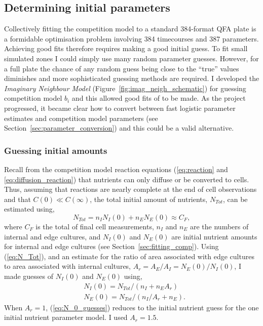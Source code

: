 \subsection{Determining initial parameters}
\label{sec:initial_guess}

Collectively fitting the competition model to a standard 384-format
QFA plate is a formidable optimisation problem involving 384
timecourses and 387 parameters. Achieving good fits therefore requires
making a good initial guess. To fit small simulated zones I could
simply use many random parameter guesses. However, for a full plate
the chance of any random guess being close to the ``true'' values
diminishes and more sophisticated guessing methods are required. I
developed the \textit{Imaginary Neighbour Model}
(Figure~\ref{fig:imag_neigh_schematic}) for guessing competition model
\(b_{i}\) and this allowed good fits of to be made. As the project
progressed, it became clear how to convert between fast logistic
parameter estimates and competition model parameters (see
Section~\ref{sec:parameter_conversion}) and this could be a valid
alternative.

\subsubsection{Guessing initial amounts}
\label{sec:guessing_amounts}

Recall from the competition model reaction equations
(\ref{eq:reaction} and \ref{eq:diffusion_reaction}) that nutrients can
only diffuse or be converted to cells. Thus, assuming that reactions
are nearly complete at the end of cell observations and that
\(C(0) \ll C(\infty)\), the total initial amount of nutrients,
\(N_{Tot}\), can be estimated using,
\begin{equation}
  \label{eq:N_Tot}
  N_{Tot} = n_{I}N_{I}(0) + n_{E}N_{E}(0) \approx C_{F},
\end{equation}
where \(C_{F}\) is the total of final cell measurements, \(n_{I}\) and
\(n_{E}\) are the numbers of internal and edge cultures, and
\(N_{I}(0)\) and \(N_{E}(0)\) are initial nutrient amounts
for internal and edge cultures (see
Section~\ref{sec:fitting_comp}). Using (\ref{eq:N_Tot}), and an estimate
for the ratio of area associated with edge cultures to area associated
with internal cultures,
\(A_{r} = A_{E} / A_{I} = N_{E}(0) / N_{I}(0)\), I made
guesses of \(N_{I}(0)\) and \(N_{E}(0)\) using,
%
\begin{equation}
  \label{eq:N_0_guesses}
  \begin{aligned}
    &N_{I}(0) = N_{Tot} / (n_{I} + n_{E}A_{r})\\
    &N_{E}(0) = N_{Tot} / (n_{I}/A_{r} + n_{E}).
  \end{aligned}
\end{equation}
%
When \(A_{r} = 1\), (\ref{eq:N_0_guesses}) reduces to the initial
nutrient guess for the one initial nutrient parameter model. I used
\(A_{r} = 1.5\).

